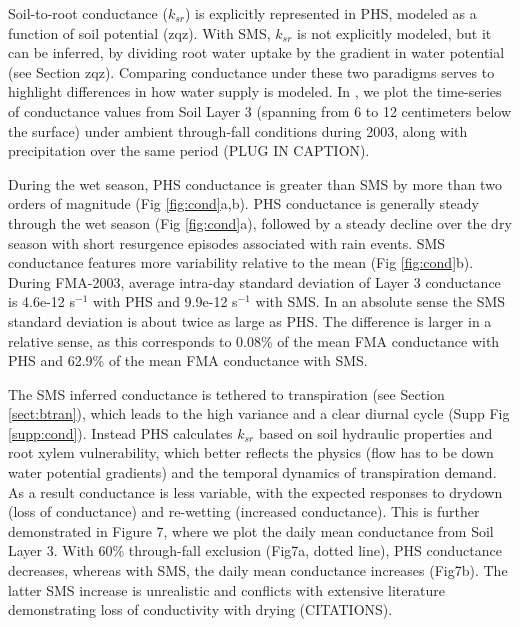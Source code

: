 \documentclass[draft,linenumbers]{agujournal}
\begin{document}
\label{sect:cond}
    
    Soil-to-root conductance ($k_{sr}$) is explicitly represented in PHS, modeled as a function of soil potential (zqz).
    With SMS, $k_{sr}$ is not explicitly modeled, but it can be inferred, by dividing root water uptake by the gradient in water potential (see Section zqz).
    Comparing conductance under these two paradigms serves to highlight differences in how water supply is modeled.
    In , we plot the time-series of conductance values from Soil Layer 3 (spanning from 6 to 12 centimeters below the surface) under ambient through-fall conditions during 2003, along with precipitation over the same period (PLUG IN CAPTION).
    
    During the wet season, PHS conductance is greater than SMS by more than two orders of magnitude (Fig \ref{fig:cond}a,b).
    PHS conductance is generally steady through the wet season (Fig \ref{fig:cond}a), followed by 
    a steady decline over the dry season with short resurgence episodes associated with rain events.
    SMS conductance features more variability relative to the mean (Fig \ref{fig:cond}b).
    During FMA-2003, average intra-day standard deviation of Layer 3 conductance is 4.6e-12 s$^{-1}$ with PHS and 9.9e-12 s$^{-1}$ with SMS. 
    In an absolute sense the SMS standard deviation is about twice as large as PHS.
    The difference is larger in a relative sense, as this corresponds to 0.08\% of the mean FMA conductance with PHS
    and 62.9\% of the mean FMA conductance with SMS.
    
    The SMS inferred conductance is tethered to transpiration (see Section \ref{sect:btran}), 
    which leads to the high variance and a clear diurnal cycle (Supp Fig \ref{supp:cond}). 
    Instead PHS calculates $k_{sr}$ based on soil hydraulic properties and root xylem vulnerability, 
    which better reflects the physics (flow has to be down water potential gradients) and the temporal dynamics of transpiration demand.
    As a result conductance is less variable, with the expected responses to drydown (loss of conductance) and re-wetting (increased conductance).
    This is further demonstrated in Figure 7, where we plot the daily mean conductance from Soil Layer 3.
    With 60\% through-fall exclusion (Fig7a, dotted line), PHS conductance decreases, whereas with SMS, the daily mean conductance increases (Fig7b).
    The latter SMS increase is unrealistic and conflicts with extensive literature demonstrating loss of conductivity with drying (CITATIONS).
    
\end{document}

